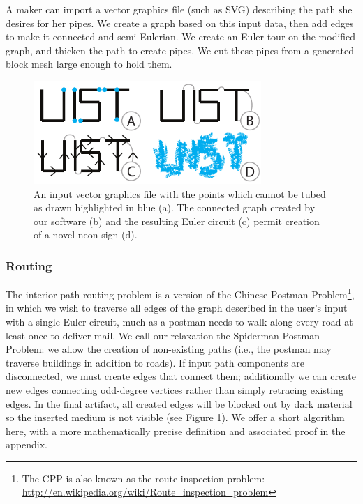 A maker can import a vector graphics file (such as SVG) describing the path she desires for her pipes.  We create a graph based on this input data, then add edges to make it connected and semi-Eulerian.  We create an Euler tour on the modified graph, and thicken the path to create pipes.    We cut these pipes from a generated block mesh large enough to hold them.

\begin{figure}[h!]
\centering
    \includegraphics[width=3.4in]{figures/interior.pdf}
\caption{An input vector graphics file with the points which cannot be tubed as drawn highlighted in {\color{blue}blue} (a).  The connected graph created by our software (b) and the resulting Euler circuit (c) permit creation of a novel neon sign (d). }
\label{fig:tool-process-interior}
\end{figure}

\subsubsection{Routing}
The interior path routing problem is a version of the Chinese Postman Problem\footnote{The CPP is also known as the route inspection problem: \url{http://en.wikipedia.org/wiki/Route_inspection_problem}}, in which we wish to traverse all edges of the graph described in the user's input with a single Euler circuit, much as a postman needs to walk along every road at least once to deliver mail.  We call our relaxation the Spiderman Postman Problem: we allow the creation of non-existing paths (i.e., the postman may traverse buildings in addition to roads).  If input path components are disconnected, we must create edges that connect them; additionally we can create new edges connecting odd-degree vertices rather than simply retracing existing edges.  In the final artifact, all created edges will be blocked out by dark material so the inserted medium is not visible (see Figure \ref{fig:tool-process-interior}).  We offer a short algorithm here, with a more mathematically precise definition and associated proof in the appendix.

